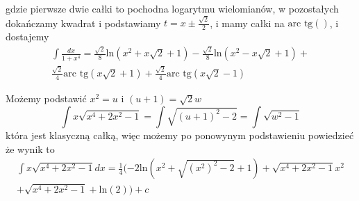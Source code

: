 \documentclass[11pt]{scrartcl}
\begin{document}
\begin{walk}
\[            \]
            gdzie pierwsze dwie całki to pochodna logarytmu wielomianów, w pozostałych dokańczamy kwadrat i podstawiamy $t = x \pm \frac{\sqrt{2} }{2}$, i mamy całki na $\text{arc tg} \left (  \right ) $, i dostajemy 
            \begin{gather*}
                \int \frac{dx}{1 + x^4} = \frac{\sqrt{2} }{8} \text{ln} \left ( x^2 + x \sqrt{2} + 1  \right ) - \frac{\sqrt{2} }{8} \text{ln} \left ( x^2 - x \sqrt{2} + 1  \right ) + \\ \frac{\sqrt{2} }{4} \text{arc tg} \left ( x \sqrt{2} + 1  \right ) + \frac{\sqrt{2} }{4} \text{arc tg} \left ( x \sqrt{2} - 1  \right )  
            \end{gather*}
          \item Możemy podstawić $x^2 = u$ i $ (u+1) = \sqrt{2}  w$
            \[
                \int x \sqrt{x^4 + 2x^2 - 1} = \int \sqrt{(u+1)^2 - 2} = \int \sqrt{w^2 - 1}
            \]
            która jest klasyczną całką, więc możemy po ponowynym podstawieniu powiedzieć że wynik to
            \begin{gather*}
                \int x \sqrt{x^4 + 2x^2 - 1} dx = \frac{1}{4} ( - 2 \text{ln} \left ( x^2 + \sqrt{(x^2)^2 -2} + 1 \right ) + \sqrt{x^4 + 2x^2 - 1} x^2 \\
                + \sqrt{x^4 + 2x^2 -1} + \text{ln} \left ( 2 \right ) )  + c
              \end{gather*}
            

\end{walk}
\end{document}
